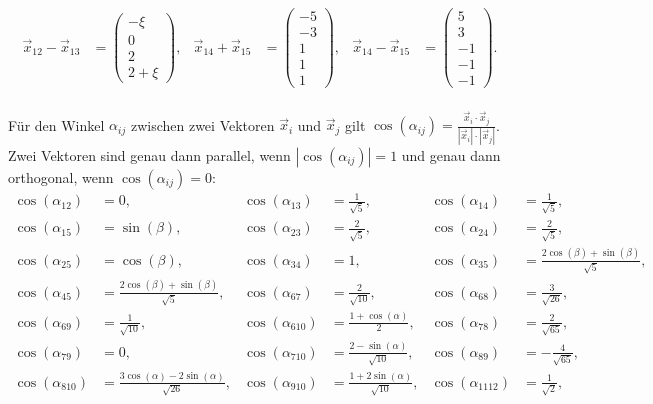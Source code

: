 \documentclass[11pt]{exam}
\begin{document}
\begin{questions}
\begin{solution}
\begin{align*}
		\vec{x}_{12}-\vec{x}_{13}&=\left(\begin{array}{c}-\xi\\0\\2\\2+\xi\end{array}\right),&
		\vec{x}_{14}+\vec{x}_{15}&=\left(\begin{array}{c}-5\\-3\\1\\1\\1\end{array}\right),&
		\vec{x}_{14}-\vec{x}_{15}&=\left(\begin{array}{c}5\\3\\-1\\-1\\-1\end{array}\right).
	\end{align*}\pagebreak\\
	Für den Winkel $\alpha_{ij}$ zwischen zwei Vektoren $\vec{x}_i$ und $\vec{x}_j$ gilt $\cos(\alpha_{ij})=\frac{\vec{x}_i\cdot\vec{x}_j}{|\vec{x}_i|\cdot|\vec{x}_j|}$. Zwei Vektoren sind genau dann parallel, wenn $|\cos(\alpha_{ij})|=1$ und genau dann orthogonal, wenn $\cos(\alpha_{ij})=0$:
	\begin{align*}
		\cos(\alpha_{12})&=0,&
		\cos(\alpha_{13})&=\frac{1}{\sqrt{5}},&
		\cos(\alpha_{14})&=\frac{1}{\sqrt{5}},\\
		\cos(\alpha_{15})&=\sin(\beta),&
		\cos(\alpha_{23})&=\frac{2}{\sqrt{5}},&
		\cos(\alpha_{24})&=\frac{2}{\sqrt{5}},\\
		\cos(\alpha_{25})&=\cos(\beta),&
		\cos(\alpha_{34})&=1,&
		\cos(\alpha_{35})&=\frac{2\cos(\beta) + \sin(\beta)}{\sqrt{5}},\\
		\cos(\alpha_{45})&=\frac{2\cos(\beta) + \sin(\beta)}{\sqrt{5}},&
		\cos(\alpha_{67})&=\frac{2}{\sqrt{10}},&
		\cos(\alpha_{68})&=\frac{3}{\sqrt{26}},\\
		\cos(\alpha_{69})&=\frac{1}{\sqrt{10}},&
		\cos(\alpha_{610})&=\frac{1 + \cos(\alpha)}{2},&
		\cos(\alpha_{78})&=\frac{2}{\sqrt{65}},\\
		\cos(\alpha_{79})&=0,&
		\cos(\alpha_{710})&=\frac{2 - \sin(\alpha)}{\sqrt{10}},&
		\cos(\alpha_{89})&=-\frac{4}{\sqrt{65}},\\
		\cos(\alpha_{810})&=\frac{3\cos(\alpha) - 2\sin(\alpha)}{\sqrt{26}},&
		\cos(\alpha_{910})&=\frac{1 + 2\sin(\alpha)}{\sqrt{10}},&
		\cos(\alpha_{1112})&=\frac{1}{\sqrt{2}},\\

\end{align*}
\end{solution}
\end{questions}
\end{document}
